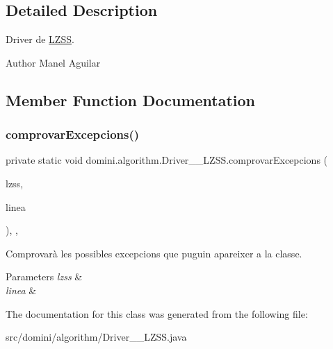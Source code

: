\subsection{Detailed Description}
Driver de \hyperlink{classdomini_1_1algorithm_1_1LZSS}{L\+Z\+SS}. 

\begin{DoxyAuthor}{Author}
Manel Aguilar 
\end{DoxyAuthor}


\subsection{Member Function Documentation}
\mbox{\label{classdomini_1_1algorithm_1_1Driver____LZSS_a3b1983c6a71cd4d510e8434cd2e7f8f2}} 
\subsubsection{\texorpdfstring{comprovar\+Excepcions()}{comprovarExcepcions()}}
{\footnotesize\ttfamily private static void domini.\+algorithm.\+Driver\+\_\+\+\_\+\+L\+Z\+S\+S.\+comprovar\+Excepcions (\begin{DoxyParamCaption}\item[{\hyperlink{classdomini_1_1algorithm_1_1LZSS}{L\+Z\+SS}}]{lzss,  }\item[{String}]{linea }\end{DoxyParamCaption})\hspace{0.3cm}{\ttfamily [inline]}, {\ttfamily [static]}, {\ttfamily [private]}}



Comprovarà les possibles excepcions que puguin apareixer a la classe. 


\begin{DoxyParams}{Parameters}
{\em lzss} & \\
\hline
{\em linea} & \\
\hline
\end{DoxyParams}


The documentation for this class was generated from the following file\+:\begin{DoxyCompactItemize}
\item 
src/domini/algorithm/Driver\+\_\+\+\_\+\+L\+Z\+S\+S.\+java\end{DoxyCompactItemize}
